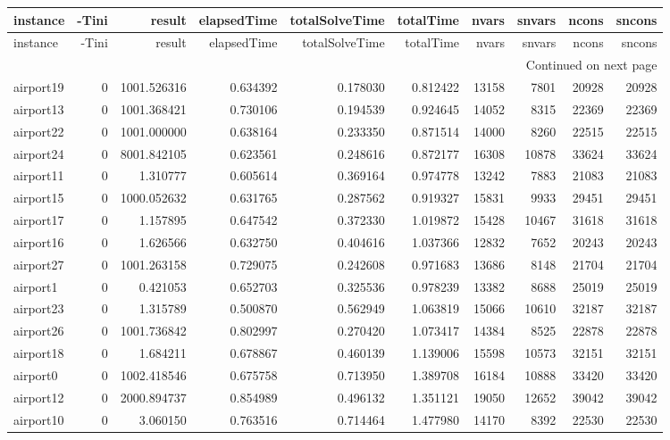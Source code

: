 \begin{longtable}{|l|r|r|r|r|r|r|r|r|r|}
\toprule
instance & -Tini & result & elapsedTime & totalSolveTime & totalTime & nvars & snvars & ncons & sncons \\
\midrule
\endfirsthead
\toprule
instance & -Tini & result & elapsedTime & totalSolveTime & totalTime & nvars & snvars & ncons & sncons \\
\midrule
\endhead
\midrule
\multicolumn{10}{r}{Continued on next page} \\
\midrule
\endfoot
\bottomrule
\endlastfoot
airport19 & 0 & 1001.526316 & 0.634392 & 0.178030 & 0.812422 & 13158 & 7801 & 20928 & 20928 \\
airport13 & 0 & 1001.368421 & 0.730106 & 0.194539 & 0.924645 & 14052 & 8315 & 22369 & 22369 \\
airport22 & 0 & 1001.000000 & 0.638164 & 0.233350 & 0.871514 & 14000 & 8260 & 22515 & 22515 \\
airport24 & 0 & 8001.842105 & 0.623561 & 0.248616 & 0.872177 & 16308 & 10878 & 33624 & 33624 \\
airport11 & 0 & 1.310777 & 0.605614 & 0.369164 & 0.974778 & 13242 & 7883 & 21083 & 21083 \\
airport15 & 0 & 1000.052632 & 0.631765 & 0.287562 & 0.919327 & 15831 & 9933 & 29451 & 29451 \\
airport17 & 0 & 1.157895 & 0.647542 & 0.372330 & 1.019872 & 15428 & 10467 & 31618 & 31618 \\
airport16 & 0 & 1.626566 & 0.632750 & 0.404616 & 1.037366 & 12832 & 7652 & 20243 & 20243 \\
airport27 & 0 & 1001.263158 & 0.729075 & 0.242608 & 0.971683 & 13686 & 8148 & 21704 & 21704 \\
airport1 & 0 & 0.421053 & 0.652703 & 0.325536 & 0.978239 & 13382 & 8688 & 25019 & 25019 \\
airport23 & 0 & 1.315789 & 0.500870 & 0.562949 & 1.063819 & 15066 & 10610 & 32187 & 32187 \\
airport26 & 0 & 1001.736842 & 0.802997 & 0.270420 & 1.073417 & 14384 & 8525 & 22878 & 22878 \\
airport18 & 0 & 1.684211 & 0.678867 & 0.460139 & 1.139006 & 15598 & 10573 & 32151 & 32151 \\
airport0 & 0 & 1002.418546 & 0.675758 & 0.713950 & 1.389708 & 16184 & 10888 & 33420 & 33420 \\
airport12 & 0 & 2000.894737 & 0.854989 & 0.496132 & 1.351121 & 19050 & 12652 & 39042 & 39042 \\
airport10 & 0 & 3.060150 & 0.763516 & 0.714464 & 1.477980 & 14170 & 8392 & 22530 & 22530 \\

\end{longtable}
